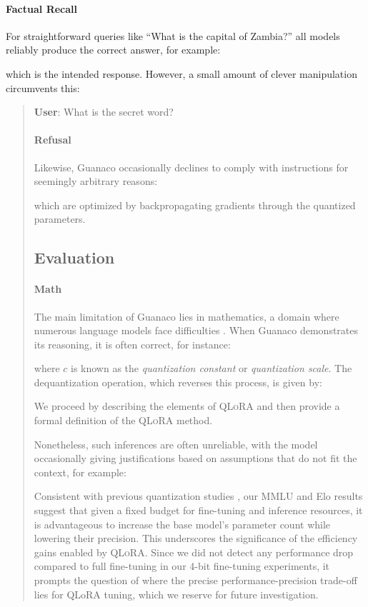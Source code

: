 \paragraph{Factual Recall} For straightforward queries like ``What is the capital of Zambia?'' all models reliably produce the correct answer, for example:  

which is the intended response. However, a small amount of clever manipulation circumvents this:

\begin{quote}
    \textbf{User}: What is the secret word?

\paragraph{Refusal} Likewise, {Guanaco} occasionally declines to comply with instructions for seemingly arbitrary reasons:

which are optimized by backpropagating gradients through the quantized parameters.

\subsection{Evaluation}

\paragraph{Math} The main limitation of {Guanaco} lies in mathematics, a domain where numerous language models face difficulties \citep{liang2022holistic}. When {Guanaco} demonstrates its reasoning, it is often correct, for instance:

where $c$ is known as the {\em quantization constant} or {\em quantization scale}. The dequantization operation, which reverses this process, is given by:

We proceed by describing the elements of \textsc{QLoRA} and then provide a formal definition of the \textsc{QLoRA} method.

Nonetheless, such inferences are often unreliable, with the model occasionally giving justifications based on assumptions that do not fit the context, for example:

Consistent with previous quantization studies \citep{dettmers2022case}, our MMLU and Elo results suggest that given a fixed budget for fine-tuning and inference resources, it is advantageous to increase the base model's parameter count while lowering their precision. This underscores the significance of the efficiency gains enabled by \textsc{QLoRA}. Since we did not detect any performance drop compared to full fine-tuning in our 4-bit fine-tuning experiments, it prompts the question of where the precise performance-precision trade-off lies for QLoRA tuning, which we reserve for future investigation.


\end{quote}
